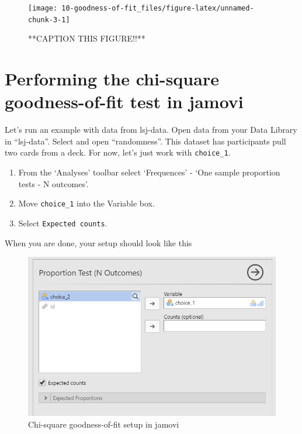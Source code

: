 \documentclass[
]{book}
\begin{document}
\begin{figure}

{\centering \texttt{[image: 10-goodness-of-fit\_files/figure-latex/unnamed-chunk-3-1]} 

}

\caption{**CAPTION THIS FIGURE!!**}\label{fig:unnamed-chunk-3}
\end{figure}

\hypertarget{performing-the-chi-square-goodness-of-fit-test-in-jamovi}{%
\section{Performing the chi-square goodness-of-fit test in jamovi}\label{performing-the-chi-square-goodness-of-fit-test-in-jamovi}}

Let's run an example with data from lsj-data. Open data from your Data Library in ``lsj-data''. Select and open ``randomness''. This dataset has participants pull two cards from a deck. For now, let's just work with \texttt{choice\_1}.

\begin{enumerate}
\def\labelenumi{\arabic{enumi}.}
\item
  From the `Analyses' toolbar select `Frequences' - `One sample proportion tests - N outcomes'.
\item
  Move \texttt{choice\_1} into the Variable box.
\item
  Select \texttt{Expected\ counts}.
\end{enumerate}

When you are done, your setup should look like this

\begin{figure}

{\centering \includegraphics[width=0.8\linewidth]{images/09-chi-square/chi-square_setup} 

}

\caption{Chi-square goodness-of-fit setup in jamovi}\label{fig:unnamed-chunk-4}
\end{figure}
\end{document}
